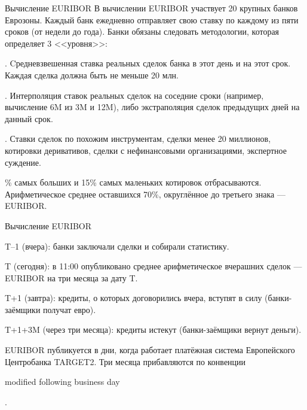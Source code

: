\documentclass{beamer}
\newcommand{\en}[1]{\begin{otherlanguage}{english}#1\end{otherlanguage}}
\begin{document}
\begin{frame}{Вычисление EURIBOR}
\justify
В вычислении EURIBOR участвует 20 крупных банков Еврозоны. Каждый банк ежедневно отправляет свою ставку по каждому из пяти сроков (от недели до года). Банки обязаны следовать методологии, которая определяет 3 <<уровня>>:

. Cредневзвешенная ставка реальных сделок банка в этот день и на этот срок. Каждая сделка должна быть не меньше 20 млн.

. Интерполяция ставок реальных сделок на соседние сроки (например, вычисление 6M из 3M и 12M), либо экстраполяция сделок предыдущих дней на данный срок.

. Ставки сделок по похожим инструментам, сделки менее 20 миллионов, котировки деривативов, сделки с нефинансовыми организациями, экспертное суждение. 

\% самых больших и 15\% самых маленьких котировок отбрасываются. Арифметическое среднее оставшихся 70\%, округлённое до третьего знака --- EURIBOR.
\end{frame}



\begin{frame}{Вычисление EURIBOR}
\centering
{}
	
\justify
T--1 (вчера):  банки заключали сделки и собирали статистику.

T (сегодня): в 11:00 опубликовано среднее арифметическое вчерашних сделок --- EURIBOR на три месяца за дату T.

T+1 (завтра): кредиты, о которых договорились вчера, вступят в силу (банки-заёмщики получат евро).

T+1+3M (через три месяца): кредиты истекут (банки-заёмщики вернут деньги).

\justify
EURIBOR публикуется в дни, когда работает платёжная система Европейского Центробанка TARGET2. Три месяца прибавляются по конвенции \en{modified following business day}.
\end{frame}
\end{document}
